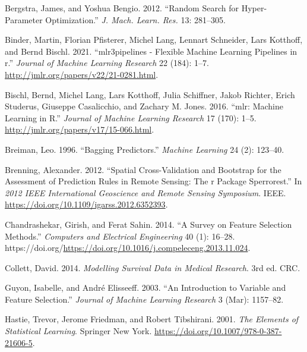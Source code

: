 \documentclass[
]{scrbook}
\newlength{\cslhangindent}
\newlength{\cslentryspacingunit} %
\newenvironment{CSLReferences}[2] %
 {%
  \setlength{\parindent}{0pt}
  \ifodd #1
  \let\oldpar\par
  \def\par{\hangindent=\cslhangindent\oldpar}
  \fi
  \setlength{\parskip}{#2\cslentryspacingunit}
 }%
 {}
\begin{document}
\hypertarget{refs}{}
\begin{CSLReferences}{1}{0}
\leavevmode{}%
Bergstra, James, and Yoshua Bengio. 2012. {``Random {Search} for {Hyper}-Parameter {Optimization}.''} \emph{J. Mach. Learn. Res.} 13: 281--305.

\leavevmode{}%
Binder, Martin, Florian Pfisterer, Michel Lang, Lennart Schneider, Lars Kotthoff, and Bernd Bischl. 2021. {``{mlr3pipelines} - Flexible Machine Learning Pipelines in r.''} \emph{Journal of Machine Learning Research} 22 (184): 1--7. \url{http://jmlr.org/papers/v22/21-0281.html}.

\leavevmode{}%
Bischl, Bernd, Michel Lang, Lars Kotthoff, Julia Schiffner, Jakob Richter, Erich Studerus, Giuseppe Casalicchio, and Zachary M. Jones. 2016. {``{mlr}: {M}achine {L}earning in {R}.''} \emph{Journal of Machine Learning Research} 17 (170): 1--5. \url{http://jmlr.org/papers/v17/15-066.html}.

\leavevmode{}%
Breiman, Leo. 1996. {``Bagging Predictors.''} \emph{Machine Learning} 24 (2): 123--40.

\leavevmode{}%
Brenning, Alexander. 2012. {``Spatial Cross-Validation and Bootstrap for the Assessment of Prediction Rules in Remote Sensing: The r Package Sperrorest.''} In \emph{2012 {IEEE} International Geoscience and Remote Sensing Symposium}. {IEEE}. \url{https://doi.org/10.1109/igarss.2012.6352393}.

\leavevmode{}%
Chandrashekar, Girish, and Ferat Sahin. 2014. {``A Survey on Feature Selection Methods.''} \emph{Computers and Electrical Engineering} 40 (1): 16--28. https://doi.org/\url{https://doi.org/10.1016/j.compeleceng.2013.11.024}.

\leavevmode{}%
Collett, David. 2014. \emph{{Modelling Survival Data in Medical Research}}. 3rd ed. CRC.

\leavevmode{}%
Guyon, Isabelle, and André Elisseeff. 2003. {``An Introduction to Variable and Feature Selection.''} \emph{Journal of Machine Learning Research} 3 (Mar): 1157--82.

\leavevmode{}%
Hastie, Trevor, Jerome Friedman, and Robert Tibshirani. 2001. \emph{The Elements of Statistical Learning}. Springer New York. \url{https://doi.org/10.1007/978-0-387-21606-5}.


\end{CSLReferences}
\end{document}

